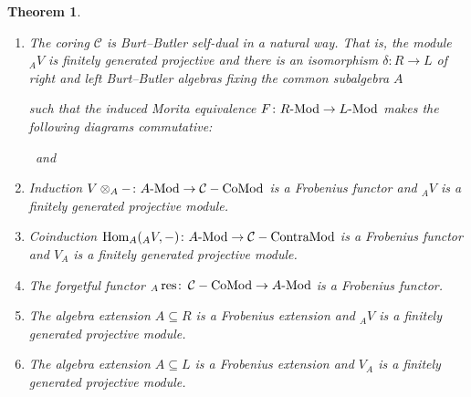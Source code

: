 \documentclass[12pt,a4paper]{amsart}
\theoremstyle{plain}
\newtheorem{thm}{Theorem}[section]
\theoremstyle{definition}
\numberwithin{equation}{thm}
\DeclareMathOperator{\Hom}{Hom}
\DeclareMathOperator{\CCoMod}{\mathcal{C}-CoMod}
\DeclareMathOperator{\CContraMod}{\mathcal{C}-ContraMod}
\DeclareMathOperator{\res}{res}
\DeclareMathOperator{\rest}{res}
\DeclareMathOperator{\incl}{inc}
\newcommand{\Mod}[1]{#1\hbox{-}\mathrm{Mod}}
\begin{document}
{\begin{thm}
\begin{enumerate}
  
\item\label{mainthm1:4} The coring $\mathcal{C}$ is Burt--Butler self-dual in a natural way. That is, the module ${}_AV$ is finitely generated projective and there is
  an isomorphism $\delta\colon R \rightarrow L$ of right and left Burt--Butler algebras
  fixing the common subalgebra $A$ 
\begin{center}
\end{center}
such that the induced Morita equivalence $F\colon \Mod{R} \rightarrow \Mod{L}$
  makes the following diagrams commutative:

{\footnotesize
{}
\mbox{~\;and\;\;}
}

\item\label{mainthm1:5} Induction $V \otimes_A -\colon \Mod{A} \rightarrow \CCoMod$ is a
  Frobenius functor and ${}_AV$ is a finitely generated projective module.

\item\label{mainthm1:6} Coinduction $\Hom_A({}_AV,-)\colon \Mod{A} \rightarrow \CContraMod$ is a Frobenius
  functor and $V_A$ is a finitely generated projective module.

\item\label{mainthm1:7} The forgetful functor ${}_A\res\colon
  \CCoMod \rightarrow \Mod{A}$ is a Frobenius functor.  

\item\label{mainthm1:8} The algebra extension $A \subseteq R$ is a Frobenius extension and
  ${}_A V$ is a finitely generated projective module.

\item\label{mainthm1:9}  The algebra extension $A \subseteq L$ is a Frobenius extension and
  $V_A$ is a finitely generated projective module. 


\end{enumerate}
\end{thm}}
\end{document}

